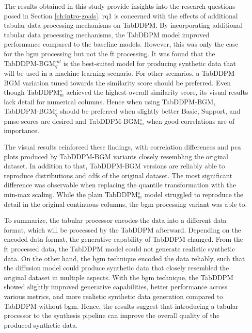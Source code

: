 The results obtained in this study provide insights into the research questions posed in Section \ref{ch:intro-goals}.
\gls{rq}1 is concerned with the effects of additional tabular data processing mechanisms on TabDDPM.
By incorporating additional tabular data processing mechanisms, the TabDDPM model improved performance compared to the baseline models.
However, this was only the case for the \gls{bgm} processing but not the \gls{ft} processing.
It was found that the TabDDPM-BGM$^{ml}_q$ is the best-suited model for producing synthetic data that will be used in a machine-learning scenario.
For other scenarios, a TabDDPM-BGM variation tuned towards the similarity score should be preferred.
Even though TabDDPM$^{s}_m$ achieved the highest overall similarity score, its visual results lack detail for numerical columns.
Hence when using TabDDPM-BGM, TabDDPM-BGM$^{s}_q$ should be preferred when slightly better Basic, Support, and \gls{pmse} scores are desired and TabDDPM-BGM$^{s}_m$ when good correlations are of importance.

The visual results reinforced these findings, with correlation differences and \gls{pca} plots produced by TabDDPM-BGM variants closely resembling the original dataset.
In addition to that, TabDDPM-BGM versions are reliably able to reproduce distributions and \glspl{cdf} of the original dataset.
The most significant difference was observable when replacing the quantile transformation with the min-max scaling.
While the plain TabDDPM$^s_m$ model struggled to reproduce the detail in the original continuous columns, the \gls{bgm} processing variant was able to.

To summarize, the tabular processor encodes the data into a different data format, which will be processed by the TabDDPM afterward.
Depending on the encoded data format, the generative capability of TabDDPM changed.
From the \gls{ft} processed data, the TabDDPM model could not generate realistic synthetic data.
On the other hand, the \gls{bgm} technique encoded the data reliably, such that the diffusion model could produce synthetic data that closely resembled the original dataset in multiple aspects.
With the \gls{bgm} technique, the TabDDPM showed slightly improved generative capabilities, better performance across various metrics, and more realistic synthetic data generation compared to TabDDPM without \gls{bgm}.
Hence, the results suggest that introducing a tabular processor to the synthesis pipeline can improve the overall quality of the produced synthetic data.


